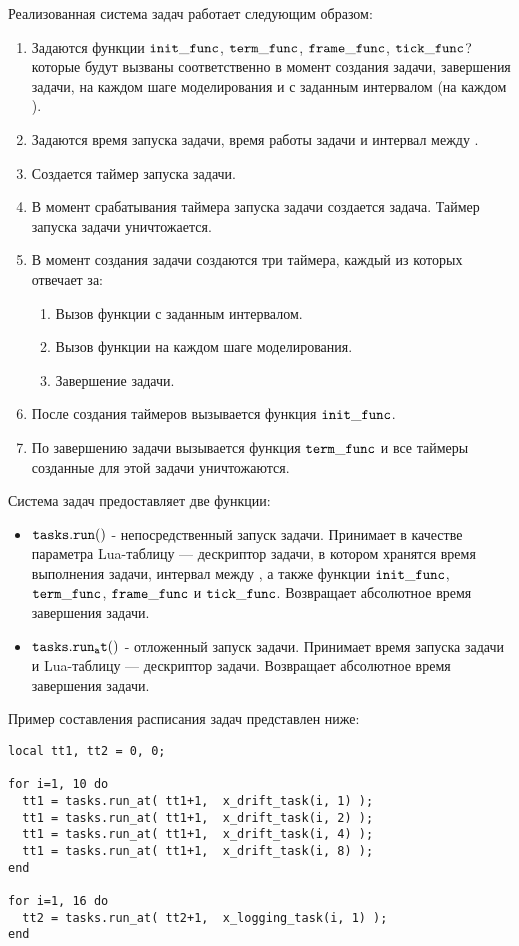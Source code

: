 Реализованная система задач работает следующим образом:
\begin{enumerate}
	\item 	Задаются функции $\tt init\_func$, $\tt term\_func$, $\tt frame\_func$, 
			$\tt tick\_func$? которые будут вызваны соответственно в момент создания задачи, 
			завершения задачи, на каждом шаге моделирования и с заданным интервалом 
			(на каждом ).
	\item	Задаются время запуска задачи, время работы задачи и интервал между .
	\item 	Создается таймер запуска задачи.
	\item 	В момент срабатывания таймера запуска задачи создается задача. 
			Таймер запуска задачи уничтожается.
	\item 	В момент создания задачи создаются три таймера, каждый из которых отвечает за:
	\begin{enumerate}
	\item	Вызов функции с заданным интервалом.
	\item	Вызов функции на каждом шаге моделирования.
	\item	Завершение задачи.
	\end{enumerate}	 
	\item 	После создания таймеров вызывается функция $\tt init\_func$.
	\item	По завершению задачи вызывается функция $\tt term\_func$ и все 
			таймеры созданные для этой задачи уничтожаются.
\end{enumerate}

Система задач предоставляет две функции:
\begin{itemize}
	\item	$\tt tasks.run()$ - непосредственный запуск задачи. 
			Принимает в качестве параметра Lua-таблицу --- 
			дескриптор задачи, в котором хранятся время выполнения задачи, 
			интервал между , а также функции 
			$\tt init\_func$, $\tt term\_func$, $\tt frame\_func$ 
			и $\tt tick\_func$. Возвращает абсолютное время завершения задачи.
	\item	$\tt tasks.run_at()$ - отложенный запуск задачи. 	
			Принимает время запуска задачи и Lua-таблицу --- дескриптор задачи. 
			Возвращает абсолютное время завершения задачи.
\end{itemize}

Пример составления расписания задач представлен ниже:

\begin{lstlisting}[caption={Пример создания расписания задач}]
local tt1, tt2 = 0, 0;

for i=1, 10 do
  tt1 = tasks.run_at( tt1+1,  x_drift_task(i, 1) );
  tt1 = tasks.run_at( tt1+1,  x_drift_task(i, 2) );
  tt1 = tasks.run_at( tt1+1,  x_drift_task(i, 4) );
  tt1 = tasks.run_at( tt1+1,  x_drift_task(i, 8) );
end

for i=1, 16 do
  tt2 = tasks.run_at( tt2+1,  x_logging_task(i, 1) );
end
\end{lstlisting}


